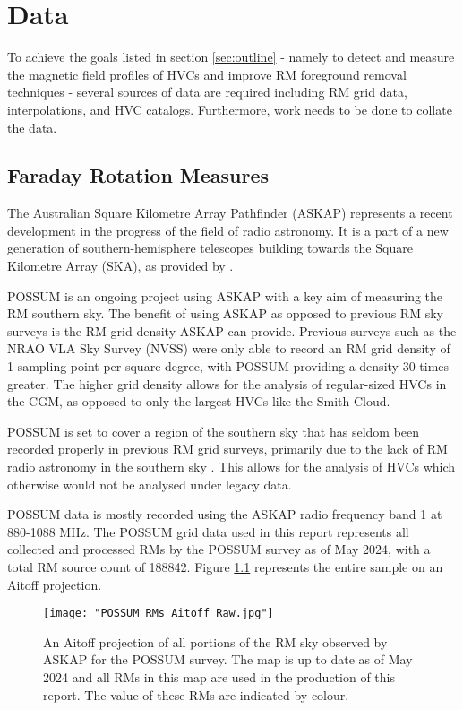 \chapter{Data}
\label{cha:data}

To achieve the goals listed in section \ref{sec:outline} - namely to detect and measure the magnetic field profiles of HVCs and improve RM foreground removal techniques - several sources of data are required including RM grid data, interpolations, and HVC catalogs. Furthermore, work needs to be done to collate the data.

\section{Faraday Rotation Measures}
\label{sec:ASKAP}

The Australian Square Kilometre Array Pathfinder (ASKAP) represents a recent development in the progress of the field of radio astronomy. It is a part of a new generation of southern-hemisphere telescopes building towards the Square Kilometre Array (SKA), as provided by \cite{ID61, ID52, ID71}.


POSSUM is an ongoing project using ASKAP with a key aim of measuring the RM southern sky. The benefit of using ASKAP as opposed to previous RM sky surveys is the RM grid density ASKAP can provide. Previous surveys such as the NRAO VLA Sky Survey (NVSS) were only able to record an RM grid density of 1 sampling point per square degree, with POSSUM providing a density 30 times greater. The higher grid density allows for the analysis of regular-sized HVCs in the CGM, as opposed to only the largest HVCs like the Smith Cloud.


POSSUM is set to cover a region of the southern sky that has seldom been recorded properly in previous RM grid surveys, primarily due to the lack of RM radio astronomy in the southern sky \citep{ID44, ID45, ID52, ID71}. This allows for the analysis of HVCs which otherwise would not be analysed under legacy data.


POSSUM data is mostly recorded using the ASKAP radio frequency band 1 at 880-1088 MHz. The POSSUM grid data used in this report represents all collected and processed RMs by the POSSUM survey as of May 2024, with a total RM source count of 188842. Figure \ref{fig:rm_map} represents the entire sample on an Aitoff projection.

\begin{figure}
    \texttt{[image: "POSSUM\_RMs\_Aitoff\_Raw.jpg"]}
    \centering
    \caption{An Aitoff projection of all portions of the RM sky observed by ASKAP for the POSSUM survey. The map is up to date as of May 2024 and all RMs in this map are used in the production of this report. The value of these RMs are indicated by colour.}
    \label{fig:rm_map}
\end{figure}

